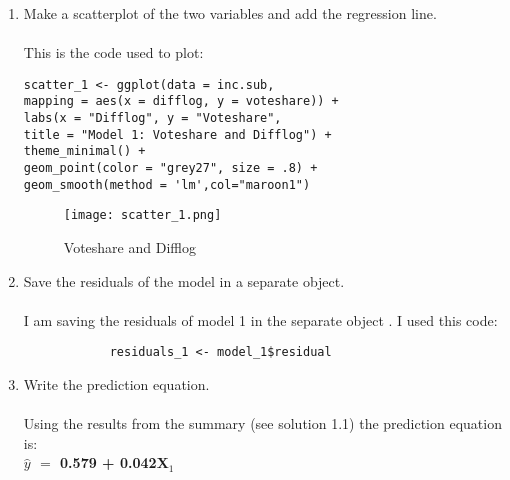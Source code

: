 \documentclass[12pt,letterpaper]{article}
\begin{document}
\begin{enumerate}
\newpage
			
			\vspace{5cm}
		\item Make a scatterplot of the two variables and add the regression line. 
	\\\\ This is the code used to plot:
	\begin{verbatim}
scatter_1 <- ggplot(data = inc.sub,          
mapping = aes(x = difflog, y = voteshare)) +   
labs(x = "Difflog", y = "Voteshare",       
title = "Model 1: Voteshare and Difflog") + 
theme_minimal() +   
geom_point(color = "grey27", size = .8) +  
geom_smooth(method = 'lm',col="maroon1")
	\end{verbatim}
		\begin{figure}[h!]
			\caption{\footnotesize{Voteshare and Difflog}}
			\vspace{.2cm}
			\centering
			\label{fig:}
			\texttt{[image: scatter\_1.png]}
		\end{figure}		
\newpage		
			\vspace{1cm}
		\item Save the residuals of the model in a separate object.	\\\\
	I am saving the residuals of model 1 in the separate object . I used this code:
		\begin{verbatim}
			residuals_1 <- model_1$residual
		\end{verbatim}
		
		\vspace{.5cm}
		\item Write the prediction equation. \\\\
		Using the results from the summary (see solution 1.1) the prediction equation is:\\ 
		\textbf {$\hat{y}$ $=$ 0.579 + 0.042X$_1$}
\end{enumerate}
	
\newpage
\end{document}
